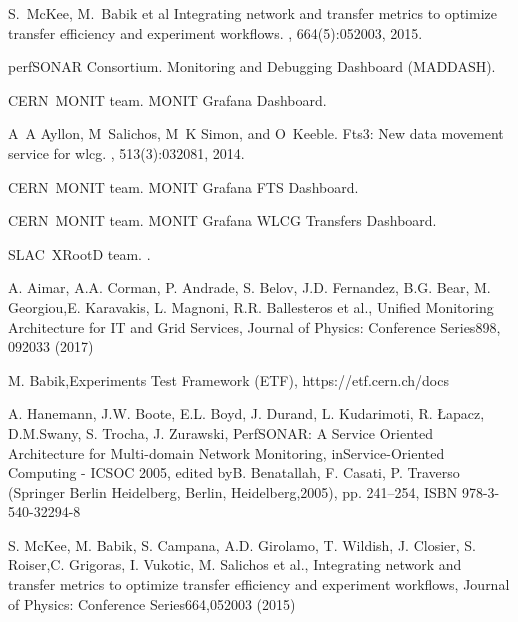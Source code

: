 \begin{thebibliography}{}
S.~McKee, M.~Babik et al 
\newblock Integrating network and transfer metrics to optimize transfer
  efficiency and experiment workflows.
, 664(5):052003, 2015.

perfSONAR Consortium.
 {Monitoring and Debugging Dashboard (MADDASH)}.

CERN~{MONIT} team.
 {MONIT} {Grafana} {Dashboard}.

A~A Ayllon, M~Salichos, M~K Simon, and O~Keeble.
\newblock Fts3: New data movement service for wlcg.
, 513(3):032081, 2014.

CERN~{MONIT} team.
 {MONIT} {Grafana} {FTS} {Dashboard}.
 
CERN~{MONIT} team.
 {MONIT} {Grafana} {WLCG} {Transfers} {Dashboard}.


SLAC~{XRootD} team.
.


 A. Aimar, A.A. Corman, P. Andrade, S. Belov, J.D. Fernandez, B.G. Bear, M. Georgiou,E. Karavakis, L. Magnoni, R.R. Ballesteros et al., Unified Monitoring Architecture for IT and Grid Services, Journal of Physics: Conference Series898, 092033 (2017)

 M. Babik,Experiments Test Framework (ETF), https://etf.cern.ch/docs

 A.  Hanemann,  J.W.  Boote,  E.L.  Boyd,  J.  Durand,  L.  Kudarimoti,  R.  Łapacz,  D.M.Swany, S. Trocha, J. Zurawski, PerfSONAR: A Service Oriented Architecture for Multi-domain Network Monitoring, inService-Oriented Computing - ICSOC 2005, edited byB. Benatallah, F. Casati, P. Traverso (Springer Berlin Heidelberg, Berlin, Heidelberg,2005), pp. 241–254, ISBN 978-3-540-32294-8

  S. McKee, M. Babik, S. Campana, A.D. Girolamo, T. Wildish, J. Closier, S. Roiser,C. Grigoras, I. Vukotic, M. Salichos et al., Integrating network and transfer metrics to optimize transfer efficiency and experiment workflows, Journal of Physics:  Conference Series664,052003 (2015)


\end{thebibliography}
